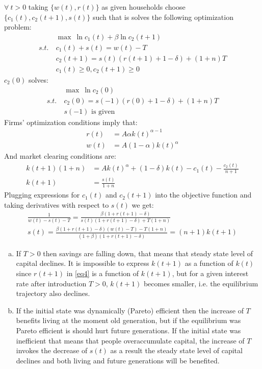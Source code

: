 \documentclass[a4paper]{article}
\begin{document}
\begin{enumerate}
	
	$\forall\ t > 0$ taking $\{w(t), r(t)\}$ as given households choose $\{c_1(t), c_2(t+1), s(t)\}$ such that is solves the following optimization problem:
	\begin{align*}
	&\max\ \ln c_1(t) + \beta \ln c_2(t+1)\\
	s.t.\ &c_1(t) +s(t) = w(t) - T\\
	& c_2(t+1) = s(t)(r(t+1) + 1 - \delta) + (1+n)T\\
	&c_1(t) \ge 0, c_2(t+1) \ge 0
	\end{align*}
	$c_2(0)$ solves:
	\begin{align*}
	&\max\ \ln c_2(0)\\
	s.t.\ &c_2(0) = s(-1)(r(0) + 1 - \delta) + (1+n)T\\
	&s(-1) \text{ is given }
	\end{align*}
	Firms' optimization conditions imply that:
	\begin{align*}
	r(t) &= A\alpha k(t)^{\alpha - 1}\\
	w(t) &= A(1 - \alpha) k(t)^{\alpha}
	\end{align*}
	And market clearing conditions are:
	\begin{align*}
	k(t+1)(1+n) &= Ak(t)^{\alpha} + (1-\delta)k(t) - c_1(t) - \frac{c_2(t)}{n+1}\\
	k(t+1) &= \frac{s(t)}{1+n}
	\end{align*}
	Plugging expressions for $c_1(t)$ and $c_2(t+1)$ into  the objective function and taking derivatives with respect to $s(t)$ we get:
	\begin{align}\label{eq4}
	\frac{1}{w(t) - s(t) - T} = \frac{\beta(1+r(t+1) - \delta)}{s(t)(1 + r(t+1) - \delta) + T(1+n)}\nonumber\\
	s(t) = \frac{\beta (1 + r(t+1) - \delta)(w(t) - T) - T(1+n)}{(1+\beta)(1 + r(t+1) - \delta)} = (n+1)k(t+1)
	\end{align}
	\begin{enumerate}[(a)]
	\item If $T > 0$ then savings are falling down, that means that steady state level of capital declines. It is impossible to express $k(t+1)$ as a function of $k(t)$ since $r(t+1)$ in \eqref{eq4} is a function of $k(t+1)$, but for a given interest rate after introduction $T>0$, $k(t+1)$ becomes smaller, i.e. the equilibrium trajectory also declines.
	\item If the initial state was dynamically (Pareto) efficient then the increase of $T$ benefits living at the moment old generation, but if the equilibrium was Pareto efficient is should hurt future generations. If the initial state was inefficient that means that  people overaccumulate capital, the increase of $T$ invokes the decrease of $s(t)$ as a result the steady state level of capital declines and both living and future generations will be benefited.

\end{enumerate}
\end{enumerate}
\end{document}
